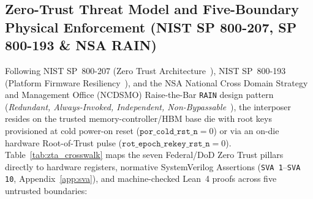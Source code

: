\documentclass[10pt,twocolumn]{article}
\theoremstyle{spectralthm}
\begin{document}
\subsection{Zero-Trust Threat Model and Five-Boundary Physical Enforcement (NIST SP 800-207, SP 800-193 \& NSA RAIN)}
\label{sec:zta_threat}
Following NIST SP~800-207 (Zero Trust Architecture~\cite{rose2020zta}), NIST SP~800-193 (Platform Firmware Resiliency~\cite{regenscheid2018pfr}), and the NSA National Cross Domain Strategy and Management Office (NCDSMO) Raise-the-Bar \texttt{RAIN} design pattern (\textit{Redundant, Always-Invoked, Independent, Non-Bypassable}~\cite{ncdsmo2020rain}), the interposer resides on the trusted memory-controller/HBM base die with root keys provisioned at cold power-on reset ($\texttt{por\_cold\_rst\_n} = 0$) or via an on-die hardware Root-of-Trust pulse ($\texttt{rot\_epoch\_rekey\_rst\_n} = 0$). Table~\ref{tab:zta_crosswalk} maps the seven Federal/DoD Zero Trust pillars directly to hardware registers, normative SystemVerilog Assertions (\texttt{SVA 1}--\texttt{SVA 10}, Appendix~\ref{app:sva}), and machine-checked Lean~4 proofs across five untrusted boundaries:
\end{document}
